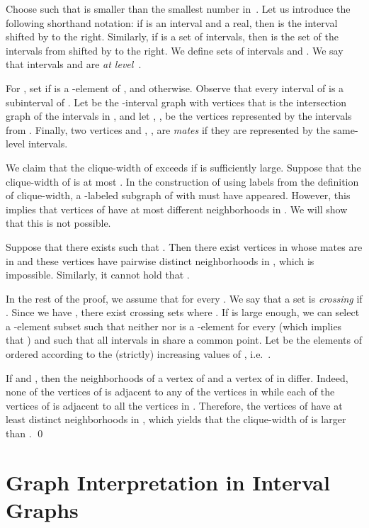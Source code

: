 \documentclass{CSML}
\theoremstyle{plain}\newtheorem{claim}[thm]{Claim}
\begin{document}
Choose  such that  is smaller than the smallest number in~.
Let us introduce the following shorthand notation:
if  is an interval and  a real,
then  is the interval  shifted by  to the right.
Similarly, if  is a set of intervals,
then  is the set of the intervals from  shifted by  to the right.
We define sets of intervals
 and
.
We say that intervals  and  are {\em at level~}.

For , set  if  is a -element of , and  otherwise.
Observe that every interval of  is a subinterval of .
Let  be the -interval graph with  vertices that
is the intersection graph of the intervals in , and
let , , be the vertices represented by the intervals from .
Finally,
two vertices  and , , are {\em mates}
if they are represented by the same-level intervals.

We claim that the clique-width of  exceeds  if  is sufficiently large.
Suppose that the clique-width of  is at most .
In the construction of  using  labels from the definition of clique-width,
a -labeled subgraph  of  with  must have appeared.
However, this implies that vertices of  have at most  different neighborhoods in .
We will show that this is not possible.

Suppose that there exists  such that .
Then there exist  vertices in  whose mates are in  and
these  vertices have pairwise distinct neighborhoods in ,
which is impossible.
Similarly, it cannot hold that .

In the rest of the proof, we assume that  for every .
We say that a set  is {\em crossing} if .
Since we have ,
there exist crossing sets   where .
If  is large enough,
we can select a -element subset 
such that neither  nor  is a -element for every  (which implies that ) and
such that all intervals in  share a common point.
Let  be the elements of  ordered according to the (strictly) increasing values of ,
i.e.~.

If  and ,
then the neighborhoods of a vertex of  and a vertex of  in  differ.
Indeed, none of the vertices of  is adjacent to any of the vertices in 
while each of the vertices of  is adjacent to all the vertices in .
Therefore, the vertices of  have at least  distinct neighborhoods in , 
which yields that the clique-width of  is larger than .
\qed


\section{Graph Interpretation in Interval Graphs}
\label{sec:interpret}
\end{document}
